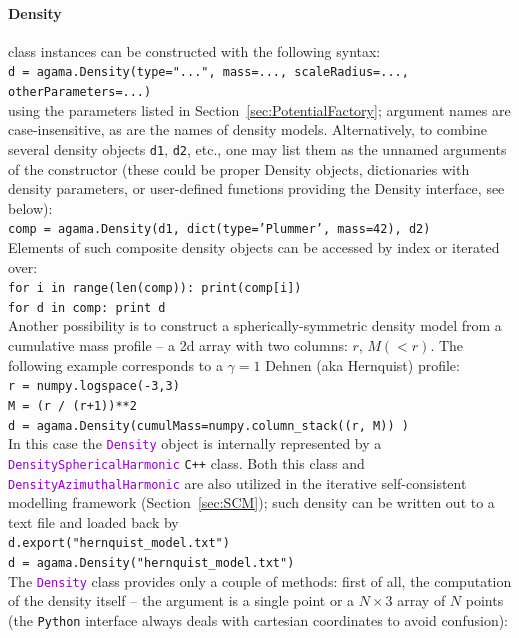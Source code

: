 \documentclass[12pt]{article}
\newcommand{\Cpp}  {\texttt{C++}\xspace}
\newcommand{\Python}{\texttt{Python}\xspace}
\newcommand{\ttt}[1]{\textcolor{darkviolet}{\texttt{#1}}}
\begin{document}
\paragraph{Density} class instances can be constructed with the following syntax: \\
\texttt{d = agama.Density(type="...", mass=..., scaleRadius=..., otherParameters=...)}\\
using the parameters listed in Section~\ref{sec:PotentialFactory}; argument names are case-insensitive, as are the names of density models. 
Alternatively, to combine several density objects \texttt{d1}, \texttt{d2}, etc., one may list them as the unnamed arguments of the constructor (these could be proper Density objects, dictionaries with density parameters, or user-defined functions providing the Density interface, see below):\\
\texttt{comp = agama.Density(d1, dict(type='Plummer', mass=42), d2)}\\[2mm]
Elements of such composite density objects can be accessed by index or iterated over:\\
\texttt{for i in range(len(comp)): print(comp[i])}\\
\texttt{for d in comp: print d}\\[2mm]
Another possibility is to construct a spherically-symmetric density model from a cumulative mass profile -- a 2d array with two columns: $r$, $M(<r)$. The following example corresponds to a $\gamma=1$ Dehnen (aka Hernquist) profile:\\
\texttt{r = numpy.logspace(-3,3)}\\
\texttt{M = (r / (r+1))**2}\\
\texttt{d = agama.Density(cumulMass=numpy.column_stack((r, M)) )}\\[2mm]
In this case the \ttt{Density} object is internally represented by a \ttt{DensitySphericalHarmonic} \Cpp class. Both this class and \ttt{DensityAzimuthalHarmonic} are also utilized in the iterative self-consistent modelling framework (Section~\ref{sec:SCM}); such density can be written out to a text file and loaded back by\\
\texttt{d.export("hernquist_model.txt")}\\
\texttt{d = agama.Density("hernquist_model.txt")}\\[2mm]
The \ttt{Density} class provides only a couple of methods: first of all, the computation of the density itself -- the argument is a single point or a $N\times3$ array of $N$ points (the \Python interface always deals with cartesian coordinates to avoid confusion):\\
\end{document}
